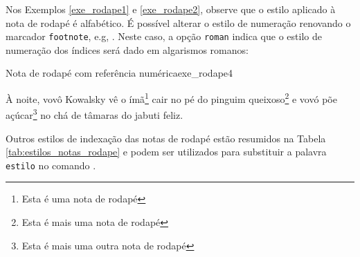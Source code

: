 
Nos Exemplos \ref{exe_rodape1} e \ref{exe_rodape2}, observe que o estilo aplicado à nota de rodapé é alfabético. É possível alterar o estilo de numeração renovando o marcador {\tt footnote}, e.g, \texttt{\renewcommand{\thefootnote}{\roman{footnote}}}. Neste caso, a opção {\tt roman} indica que o estilo de numeração dos índices será dado em algarismos romanos:

\renewcommand{\thefootnote}{\Roman{footnote}}

\begin{texexptitled}[breakable,enhanced,middle=2mm]{Nota de rodapé com referência numérica}{exe_rodape4}
\renewcommand{\thefootnote}{\Roman{footnote}}

À noite, vovô Kowalsky vê o ímã\footnote{Esta é uma nota de rodapé} 
cair no pé do pinguim queixoso\footnote{Esta é mais uma nota de rodapé}
e vovó põe açúcar\footnote{Esta é mais uma outra nota de rodapé} no
chá de tâmaras do jabuti feliz.
\end{texexptitled}

Outros estilos de indexação das notas de rodapé estão resumidos na Tabela \ref{tab:estilos_notas_rodape} e podem ser utilizados para substituir a palavra {\tt estilo} no comando \texttt{\renewcommand{\thefootnote}{\estilo{footnote}}}.

